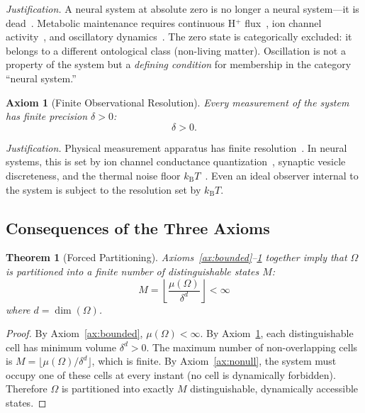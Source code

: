 \documentclass[10pt,twocolumn]{article}
\newtheorem{theorem}{Theorem}[section]
\newtheorem{axiom}{Axiom}
\theoremstyle{remark}
\newcommand{\kB}{k_{\mathrm{B}}}
\begin{document}
\noindent\textit{Justification.} A neural system at absolute zero is no longer a neural system---it is dead~\cite{nicholls2013bioenergetics}. Metabolic maintenance requires continuous H$^+$ flux~\cite{mitchell1961coupling,wikstrom2015proton}, ion channel activity~\cite{doyle1998structure,hille2001ion}, and oscillatory dynamics~\cite{buzsaki2004neuronal}. The zero state is categorically excluded: it belongs to a different ontological class (non-living matter). Oscillation is not a property of the system but a \emph{defining condition} for membership in the category ``neural system.''

\begin{axiom}[Finite Observational Resolution]
\label{ax:resolution}
Every measurement of the system has finite precision $\delta > 0$:
\begin{equation}
\delta > 0.
\label{eq:resolution}
\end{equation}
\end{axiom}

\noindent\textit{Justification.} Physical measurement apparatus has finite resolution~\cite{landauer1961irreversibility,szilard1929entropy}. In neural systems, this is set by ion channel conductance quantization~\cite{doyle1998structure}, synaptic vesicle discreteness, and the thermal noise floor $\kB T$~\cite{callen1985thermodynamics}. Even an ideal observer internal to the system is subject to the resolution set by $\kB T$.

\subsection{Consequences of the Three Axioms}

\begin{theorem}[Forced Partitioning]
\label{thm:partition}
Axioms~\ref{ax:bounded}--\ref{ax:resolution} together imply that $\Omega$ is partitioned into a finite number of distinguishable states $M$:
\begin{equation}
M = \left\lfloor \frac{\mu(\Omega)}{\delta^{d}} \right\rfloor < \infty
\label{eq:M}
\end{equation}
where $d = \dim(\Omega)$.
\end{theorem}

\begin{proof}
By Axiom~\ref{ax:bounded}, $\mu(\Omega) < \infty$. By Axiom~\ref{ax:resolution}, each distinguishable cell has minimum volume $\delta^d > 0$. The maximum number of non-overlapping cells is $M = \lfloor \mu(\Omega)/\delta^d \rfloor$, which is finite. By Axiom~\ref{ax:nonull}, the system must occupy one of these cells at every instant (no cell is dynamically forbidden). Therefore $\Omega$ is partitioned into exactly $M$ distinguishable, dynamically accessible states.
\end{proof}
\end{document}

